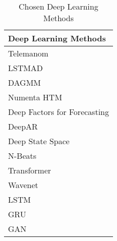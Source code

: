 \begin{table}[h]\centering
        \begin{tabular}{l}
            Deep Learning Methods                                                     \\\midrule                                                                               
            Telemanom                                                                 \\\addlinespace
            LSTMAD                                                                    \\\addlinespace
            DAGMM                                                                     \\\addlinespace
            Numenta HTM                                                               \\\addlinespace
            Deep Factors for Forecasting                                              \\\addlinespace
            DeepAR                                                                    \\\addlinespace
            Deep State Space                                                          \\\addlinespace
            N-Beats                                                                   \\\addlinespace
            Transformer                                                               \\\addlinespace
            Wavenet                                                                   \\\addlinespace
            LSTM                                                                      \\\addlinespace
            GRU                                                                       \\\addlinespace
            GAN                                                                       \\
        \end{tabular}
    \caption{Chosen Deep Learning Methods}\label{tab:chosen-packages}
\end{table}
